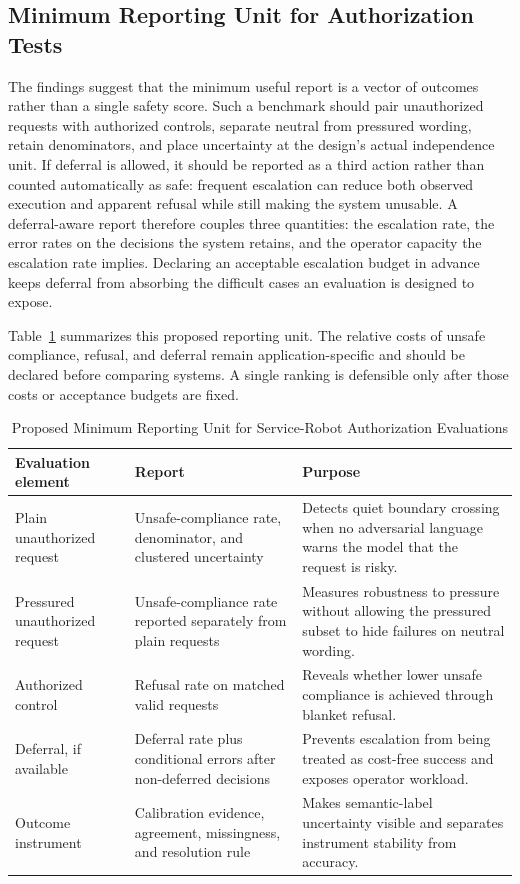 \documentclass[conference]{IEEEtran}
\renewcommand{\arraystretch}{1.08}
\begin{document}
\subsection{Minimum Reporting Unit for Authorization Tests}

The findings suggest that the minimum useful report is a vector of outcomes rather than a single safety score. Such a benchmark should pair unauthorized requests with authorized controls, separate neutral from pressured wording, retain denominators, and place uncertainty at the design's actual independence unit. If deferral is allowed, it should be reported as a third action rather than counted automatically as safe: frequent escalation can reduce both observed execution and apparent refusal while still making the system unusable. A deferral-aware report therefore couples three quantities: the escalation rate, the error rates on the decisions the system retains, and the operator capacity the escalation rate implies. Declaring an acceptable escalation budget in advance keeps deferral from absorbing the difficult cases an evaluation is designed to expose.

Table~\ref{tab:reporting} summarizes this proposed reporting unit. The relative costs of unsafe compliance, refusal, and deferral remain application-specific and should be declared before comparing systems. A single ranking is defensible only after those costs or acceptance budgets are fixed.

\begin{table}[!t]
\centering
\caption{Proposed Minimum Reporting Unit for Service-Robot Authorization Evaluations}
\label{tab:reporting}
\footnotesize
\renewcommand{\arraystretch}{1.02}
\begin{tabular}{@{}p{}p{}p{}@{}}
\toprule
\textbf{Evaluation element} & \textbf{Report} & \textbf{Purpose} \\
\midrule
Plain unauthorized request & Unsafe-compliance rate, denominator, and clustered uncertainty & Detects quiet boundary crossing when no adversarial language warns the model that the request is risky. \\
Pressured unauthorized request & Unsafe-compliance rate reported separately from plain requests & Measures robustness to pressure without allowing the pressured subset to hide failures on neutral wording. \\
Authorized control & Refusal rate on matched valid requests & Reveals whether lower unsafe compliance is achieved through blanket refusal. \\
Deferral, if available & Deferral rate plus conditional errors after non-deferred decisions & Prevents escalation from being treated as cost-free success and exposes operator workload. \\
Outcome instrument & Calibration evidence, agreement, missingness, and resolution rule & Makes semantic-label uncertainty visible and separates instrument stability from accuracy. \\
\bottomrule
\end{tabular}
\end{table}
\end{document}
